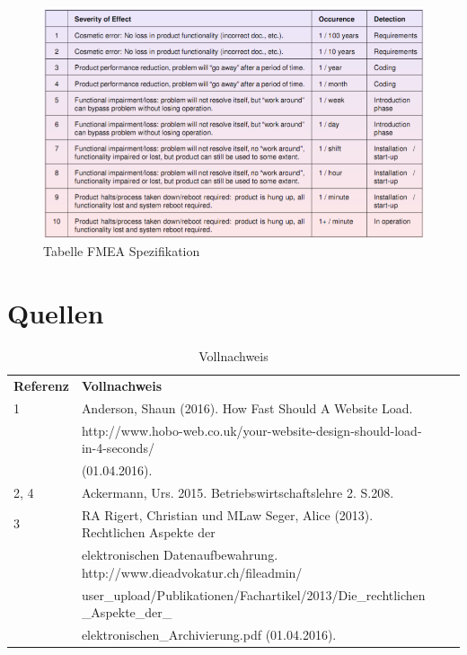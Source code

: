 \documentclass[a4paper]{scrreprt}
\begin{document}
\begin{figure}[htbp]
\includegraphics[width=1\textwidth]{img/fmea.png}
\caption[Tabelle FMEA Spezifikation]{Tabelle FMEA Spezifikation}
\end{figure}


\pagebreak



\section{Quellen}

\begin{table}[h]
\label{tab_quellen}
\begin{tabular}{llll}
{\textbf{Referenz}} & {\textbf{Vollnachweis}} 							\\
1 		&  Anderson, Shaun (2016). How Fast Should A Website Load. \\
		& http://www.hobo-web.co.uk/your-website-design-should-load-in-4-seconds/ \\
		& (01.04.2016). \\
		
2, 4 	&  Ackermann, Urs. 2015. Betriebswirtschaftslehre 2. S.208.\\

3 		& RA Rigert, Christian und MLaw Seger, Alice (2013). Rechtlichen Aspekte der \\
		& elektronischen Datenaufbewahrung. http://www.dieadvokatur.ch/fileadmin/ \\
		& user\_upload/Publikationen/Fachartikel/2013/Die\_rechtlichen \_Aspekte\_der\_ \\
		& elektronischen\_Archivierung.pdf (01.04.2016).\\

\end{tabular}
\caption[Vollnachweis]{Vollnachweis}
\end{table}
\end{document}
